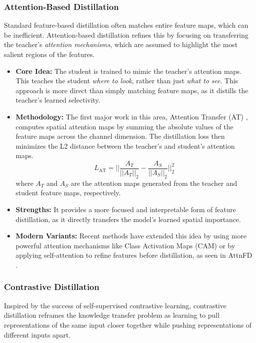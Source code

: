 \subsubsection{Attention-Based Distillation}
\label{ssec:attention_distillation}

Standard feature-based distillation often matches entire feature maps, which can be inefficient. Attention-based distillation refines this by focusing on transferring the teacher's \textit{attention mechanisms}, which are assumed to highlight the most salient regions of the features.

\begin{itemize}
    \item \textbf{Core Idea:} The student is trained to mimic the teacher's attention maps. This teaches the student \textit{where to look}, rather than just \textit{what to see}. This approach is more direct than simply matching feature maps, as it distills the teacher's learned selectivity.
    \item \textbf{Methodology:} The first major work in this area, Attention Transfer (AT) \cite{Zagoruyko2016}, computes spatial attention maps by summing the absolute values of the feature maps across the channel dimension. The distillation loss then minimizes the L2 distance between the teacher's and student's attention maps.
    \[
        L_{\text{AT}} = || \frac{A_T}{||A_T||_2} - \frac{A_S}{||A_S||_2} ||_2^2
    \]
    where \(A_T\) and \(A_S\) are the attention maps generated from the teacher and student feature maps, respectively.
    \item \textbf{Strengths:} It provides a more focused and interpretable form of feature distillation, as it directly transfers the model's learned spatial importance.
    \item \textbf{Modern Variants:} Recent methods have extended this idea by using more powerful attention mechanisms like Class Activation Maps (CAM) or by applying self-attention to refine features before distillation, as seen in AttnFD \cite{Mansourian2024}.
\end{itemize}

\subsubsection{Contrastive Distillation}
\label{ssec:contrastive_distillation}

Inspired by the success of self-supervised contrastive learning, contrastive distillation reframes the knowledge transfer problem as learning to pull representations of the same input closer together while pushing representations of different inputs apart.

